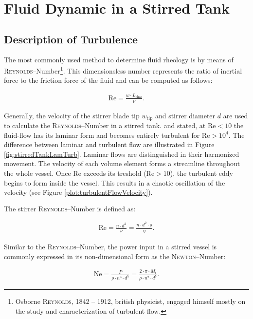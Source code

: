 \section{Fluid Dynamic in a Stirred Tank}

\subsection{Description of Turbulence}
The most commonly used method to determine fluid rheology is by means of \textsc{Reynolds}--Number\footnote{Osborne \textsc{Reynolds}, 1842 -- 1912, british physicist, engaged himself mostly on the study and characterization of turbulent flow.}. This dimensionsless number represents the ratio of inertial force to the friction force of the fluid and can be computed as follows:

\begin{align} \label{eq:reynoldGeneral}
    \text{Re} = \frac{w \cdot L_{\text{char}}}{\nu}.
\end{align}

Generally, the velocity of the stirrer blade tip $w_{\text{tip}}$ and stirrer diameter $d$ are used to calculate the \textsc{Reynolds}--Number in a stirred tank. \citet{Kraume2012Transport} and \citet{Wollny2010Diss} stated, at $\text{Re} < 10$ the fluid-flow has its laminar form and becomes entirely turbulent for $\text{Re} > 10^4$. The difference between laminar and turbulent flow are illustrated in Figure \ref{fig:stirredTankLamTurb}. Laminar flows are distinguished in their harmonized movement. The velocity of each volume element forms a streamline throughout the whole vessel. Once Re exceeds its treshold ($\text{Re} > 10$), the turbulent eddy begins to form inside the vessel. This results in a chaotic oscillation of the velocity (see Figure \ref{plot:turbulentFlowVelocity}).

The stirrer \textsc{Reynolds}--Number is defined as:

\begin{gather}
    \text{Re} = \frac{n \cdot d^2}{\nu} = \frac{n \cdot d^2 \cdot \rho}{\eta}.
\end{gather}

Similar to the \textsc{Reynolds}--Number, the power input in a stirred vessel is commonly expressed in its non-dimensional form as the \textsc{Newton}--Number:

\begin{gather}
    \text{Ne} = \frac{P}{\rho \cdot n^3 \cdot d^5} = \frac{2 \cdot \pi \cdot M_t}{\rho \cdot n^2 \cdot d^5}.
\end{gather}

